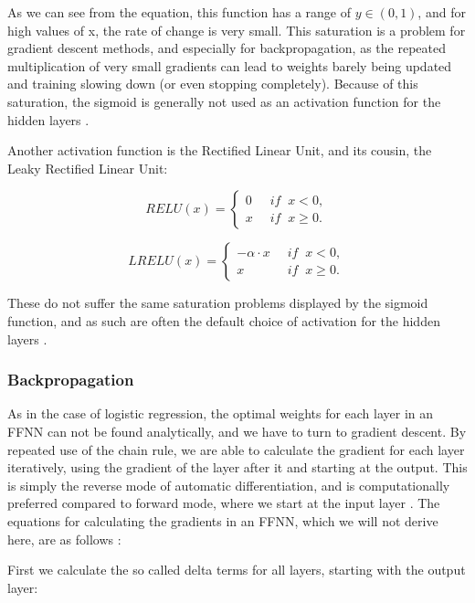 \documentclass[onecolumn,10pt,cleanfoot]{asme2ej}
\begin{document}
As we can see from the equation, this function has a range of $y \in (0,1)$, and for high values of x, the rate of change is very small. This saturation is a problem for gradient descent methods, and especially for backpropagation, as the repeated multiplication of very small gradients can lead to weights barely being updated and training slowing down (or even stopping completely). Because of this saturation, the sigmoid is generally not used as an activation function for the hidden layers \cite[191]{gbc}.

Another activation function is the Rectified Linear Unit, and its cousin, the Leaky Rectified Linear Unit:

\begin{equation}
RELU(x) = \left\{\begin{array}{cc} 0 & \; \; if \; \; x < 0, \\  x & \; \; if \; \; x \ge 0.\end{array}\right.
\end{equation}

\begin{equation}
LRELU(x) = \left\{\begin{array}{cc} -\alpha \cdot x & \; \; if \; \; x < 0, \\  x & \; \; if \; \; x \ge 0.\end{array}\right.
\end{equation}

These do not suffer the same saturation problems displayed by the sigmoid function, and as such are often the default choice of activation for the hidden layers \cite[188]{gbc}.

\subsubsection{Backpropagation}

As in the case of logistic regression, the optimal weights for each layer in an FFNN can not be found analytically, and we have to turn to gradient descent. By repeated use of the chain rule, we are able to calculate the gradient for each layer iteratively, using the gradient of the layer after it and starting at the output. This is simply the reverse mode of automatic differentiation, and is computationally preferred compared to forward mode, where we start at the input layer \cite[416]{sr}. The equations for calculating the gradients in an FFNN, which we will not derive here, are as follows \cite{morten}:

First we calculate the so called delta terms for all layers, starting with the output layer:
\end{document}
